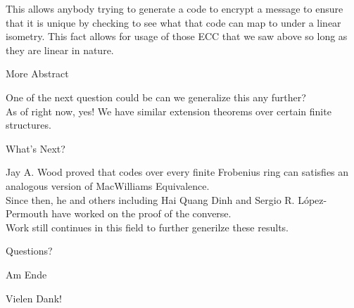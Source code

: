 \documentclass{beamer}
\begin{document}
\begin{frame}
    
    This allows anybody trying to generate a code to encrypt a message to ensure that it is unique by
    checking to see what that code can map to under a linear isometry. This fact allows for usage of
    those ECC that we saw above so long as they are linear in nature.

\end{frame}

\begin{frame}{More Abstract}
    
    One of the next question could be can we generalize this any further?\\
    As of right now, yes! We have similar extension theorems over certain finite structures.

\end{frame}

\begin{frame}{What's Next?}
    
    Jay A. Wood proved that codes over every finite Frobenius ring can satisfies an analogous version of
    MacWilliams Equivalence.\\
    Since then, he and others including Hai Quang Dinh and Sergio R. L\'{o}pez-Permouth have worked on
    the proof of the converse.\\
    Work still continues in this field to further generilze these results.

\end{frame}

\begin{frame}

    \begin{center}
        Questions?
    \end{center}

\end{frame}

\begin{frame}{Am Ende}

    \begin{center}
        Vielen Dank!
    \end{center}

\end{frame}
\end{document}
